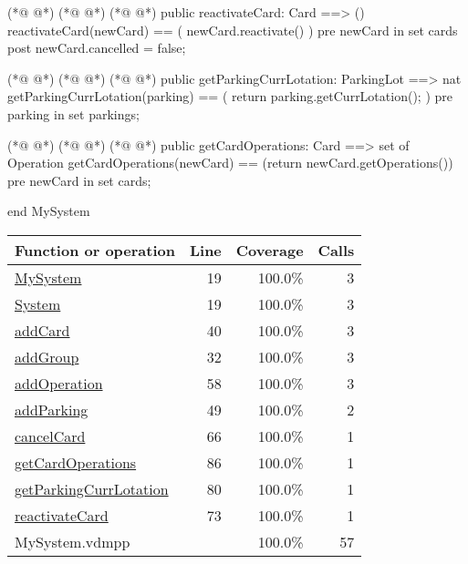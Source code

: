 \begin{vdmpp}[breaklines=true]
(*@
\label{reactivateCard:73}
@*)
(*@
\label{reactivateCard:73}
@*)
(*@
\label{reactivateCard:73}
@*)
public reactivateCard: Card ==> ()
 reactivateCard(newCard) == (
  newCard.reactivate()
 )
 pre newCard in set cards
 post newCard.cancelled = false;

(*@
\label{getParkingCurrLotation:80}
@*)
(*@
\label{getParkingCurrLotation:80}
@*)
(*@
\label{getParkingCurrLotation:80}
@*)
public getParkingCurrLotation: ParkingLot ==> nat
 getParkingCurrLotation(parking) == (
  return parking.getCurrLotation();
 )
 pre parking in set parkings;
 
(*@
\label{getCardOperations:86}
@*)
(*@
\label{getCardOperations:86}
@*)
(*@
\label{getCardOperations:86}
@*)
public getCardOperations: Card ==> set of Operation
 getCardOperations(newCard) == (return newCard.getOperations())
 pre newCard in set cards;

end MySystem
\end{vdmpp}
\bigskip
\begin{longtable}{|l|r|r|r|}
\hline
Function or operation & Line & Coverage & Calls \\
\hline
\hline
\hyperref[MySystem:19]{MySystem} & 19&100.0\% & 3 \\
\hline
\hyperref[System:19]{System} & 19&100.0\% & 3 \\
\hline
\hyperref[addCard:40]{addCard} & 40&100.0\% & 3 \\
\hline
\hyperref[addGroup:32]{addGroup} & 32&100.0\% & 3 \\
\hline
\hyperref[addOperation:58]{addOperation} & 58&100.0\% & 3 \\
\hline
\hyperref[addParking:49]{addParking} & 49&100.0\% & 2 \\
\hline
\hyperref[cancelCard:66]{cancelCard} & 66&100.0\% & 1 \\
\hline
\hyperref[getCardOperations:86]{getCardOperations} & 86&100.0\% & 1 \\
\hline
\hyperref[getParkingCurrLotation:80]{getParkingCurrLotation} & 80&100.0\% & 1 \\
\hline
\hyperref[reactivateCard:73]{reactivateCard} & 73&100.0\% & 1 \\
\hline
\hline
MySystem.vdmpp & & 100.0\% & 57 \\
\hline
\end{longtable}

